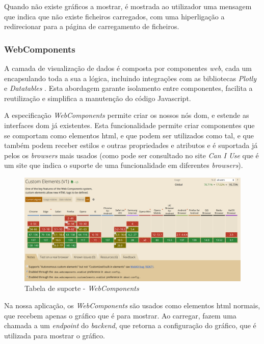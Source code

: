 Quando não existe gráficos a mostrar, é mostrada ao utilizador uma mensagem que indica que não existe ficheiros carregados, com uma hiperligação a redirecionar para a página de carregamento de ficheiros.

\subsubsection{WebComponents}

A camada de visualização de dados é composta por componentes \textit{web}, cada um encapsulando toda a sua a lógica, incluindo integrações com as bibliotecas \textit{Plotly} e \textit{Datatables} . Esta abordagem garante isolamento entre componentes, facilita a reutilização e simplifica a manutenção do código Javascript. 

A especificação \textit{WebComponents}\cite{webcomponents} permite criar os nossos nós \gls{dom}, e estende as interfaces \gls{dom} já existentes. Esta funcionalidade permite criar componentes que se comportam como elementos \gls{html}, e que podem ser utilizados como tal, e que também podem receber estilos e outras propriedades e atributos e é suportada já pelos os \textit{browsers} mais usados (como pode ser consultado no site \textit{Can I Use}\cite{caniuse} que é um site que indica o suporte de uma funcionalidade em diferentes \textit{browsers}).

\begin{figure}[H]
    \centering
    \includegraphics[max width=\textwidth]{./img/caniuse}
 \caption{Tabela de suporte - \textit{WebComponents}}
 \end{figure}

Na nossa aplicação, os \textit{WebComponents} são usados como elementos \gls{html} normais, que recebem apenas o gráfico que é para mostrar. Ao carregar, fazem uma chamada a um \textit{endpoint} do \textit{backend}, que retorna a configuração do gráfico, que é utilizada para mostrar o gráfico.

